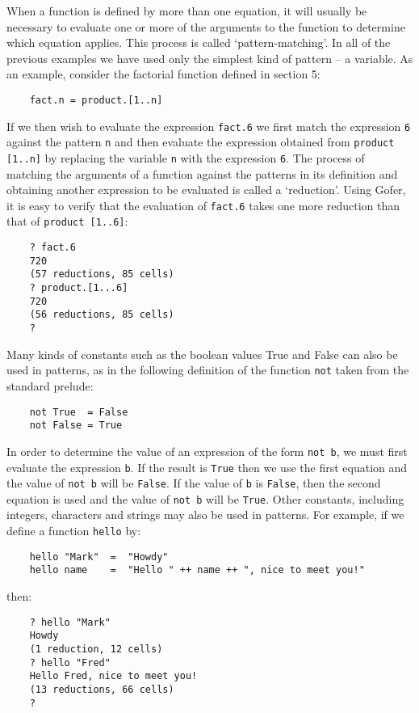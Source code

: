 When a function is defined by more than one equation, it  will  usually
be necessary to evaluate one or more of the arguments to  the  function
to  determine  which  equation  applies.   This   process   is   called
`pattern-matching'.  In all of the previous examples we have used  only
the simplest kind of pattern -- a variable.  As  an  example,  consider
the factorial function defined in section 5:
\begin{verbatim}
    fact.n = product.[1..n]
\end{verbatim}
If we then wish to evaluate the expression \verb"fact.6" we first match  the
expression \verb"6" against the pattern \verb"n" 
and then evaluate the expression
obtained from \verb"product [1..n]" by replacing 
the variable \verb"n"  with  the
expression \verb"6".  The process of matching the arguments  of  a  function
against the patterns in its definition and obtaining another expression
to be evaluated is called a `reduction'.  Using Gofer, it  is  easy  to
verify that the evaluation of \verb"fact.6" takes one  more  reduction  than
that of \verb"product [1..6]":
\begin{verbatim}
    ? fact.6
    720
    (57 reductions, 85 cells)
    ? product.[1...6]
    720
    (56 reductions, 85 cells)
    ? 
\end{verbatim}
Many kinds of constants such as the boolean values True and  False  can
also be used in  patterns,  as  in  the  following  definition  of  the
function \verb"not" taken from the standard prelude:
\begin{verbatim}
    not True  = False
    not False = True
\end{verbatim}
In order to determine the value of an expression of the form  \verb"not b",
we must first evaluate the expression \verb"b".  If  the  result  is  \verb"True"
then we use the first equation  and  the  value  of  \verb"not b"  will  be
\verb"False".  If the value of \verb"b" is \verb"False", then the second  equation  is
used and the value of \verb"not b" will be \verb"True".
Other constants, including integers, characters and strings may also be
used in patterns.  For example, if we define a function \verb"hello" by:
\begin{verbatim}
    hello "Mark"  =  "Howdy"
    hello name    =  "Hello " ++ name ++ ", nice to meet you!"
\end{verbatim}
then:
\begin{verbatim}
    ? hello "Mark"
    Howdy
    (1 reduction, 12 cells)
    ? hello "Fred"
    Hello Fred, nice to meet you!
    (13 reductions, 66 cells)
    ?
\end{verbatim}
